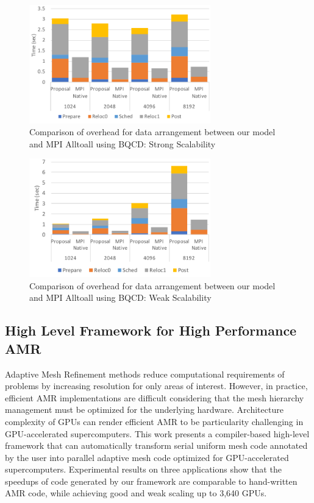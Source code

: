 \documentclass{book}
\begin{document}
\begin{figure}
  \centering
  \includegraphics[width=0.7\textwidth]{eval_bqcd_ss.pdf}
  \caption{Comparison of overhead for data arrangement between our
    model and MPI Alltoall using BQCD: Strong Scalability}
  \label{takizawa_eval_bqcd_ss}
\end{figure}

\begin{figure}
  \centering
  \includegraphics[width=0.7\textwidth]{eval_bqcd_ws.pdf}
  \caption{Comparison of overhead for data arrangement between our
    model and MPI Alltoall using BQCD: Weak Scalability}
  \label{takizawa_eval_bqcd_ws}
\end{figure}

\subsection{High Level Framework for High Performance AMR}
Adaptive Mesh Refinement methods reduce computational requirements of problems by increasing resolution for only areas of interest. However, in practice, efficient AMR implementations are difficult considering that the mesh hierarchy management must be optimized for the underlying hardware. Architecture complexity of GPUs can render efficient AMR to be particularity challenging in GPU-accelerated supercomputers. This work presents a compiler-based high-level framework that can automatically transform serial uniform mesh code annotated by the user into parallel adaptive mesh code optimized for GPU-accelerated supercomputers. Experimental results on three applications show that the speedups of code generated by our framework are comparable to hand-written AMR code, while achieving good and weak scaling up to 3,640 GPUs.
\end{document}
